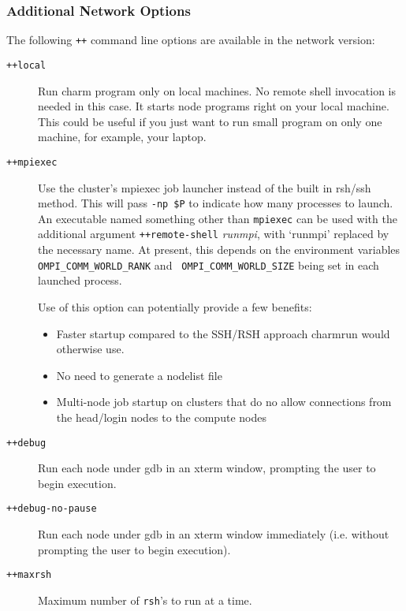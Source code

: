 \subsubsection{Additional Network Options}
\label{network command line options}

The following {\tt ++} command line options are available in
the network version:
\begin{description}

\item[{\tt ++local}] Run charm program only on local machines. No 
 remote shell invocation is needed in this case. It starts node programs 
 right on your local machine. This could be useful if you just want to 
 run small program on only one machine, for example, your laptop.


\item[{\tt ++mpiexec}]

Use the cluster's mpiexec job launcher instead of the built in rsh/ssh
method. This will pass {\tt -np \$P} to indicate how many processes to
launch. An executable named something other than {\tt mpiexec} can be
used with the additional argument {\tt ++remote-shell} {\it runmpi},
with `runmpi' replaced by the necessary name. At present, this depends
on the environment variables {\tt OMPI\_COMM\_WORLD\_RANK} and {\tt
  OMPI\_COMM\_WORLD\_SIZE} being set in each launched process.

Use of this option can potentially provide a few benefits:

\begin{itemize}
\item Faster startup compared to the SSH/RSH approach charmrun would
  otherwise use.
\item No need to generate a nodelist file
\item Multi-node job startup on clusters that do no allow connections
  from the head/login nodes to the compute nodes
\end{itemize}

\item[{\tt ++debug}] Run each node under gdb in an xterm window, prompting
the user to begin execution.

\item[{\tt ++debug-no-pause}] Run each node under gdb in an xterm window
immediately (i.e. without prompting the user to begin execution).

\item[{\tt ++maxrsh}] Maximum number of {\tt rsh}'s to run at a
time.


\end{description}

